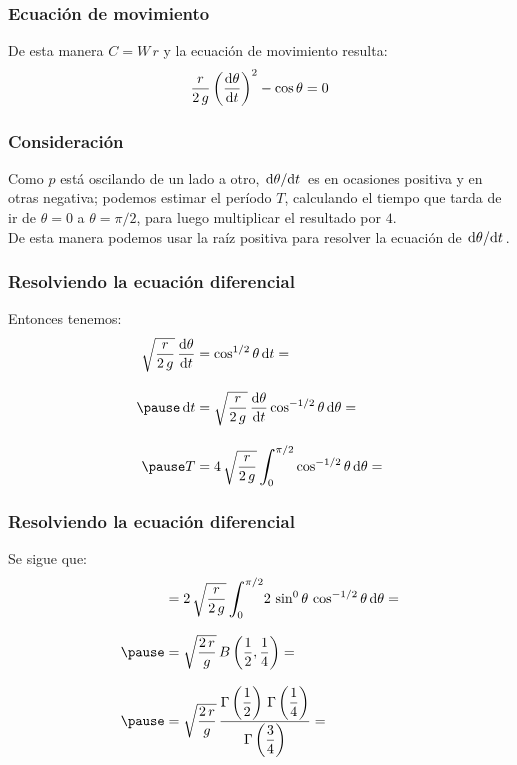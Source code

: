 \documentclass[12pt]{beamer}
\begin{document}
\begin{frame}
\frametitle{Ecuación de movimiento}
De esta manera $C = W \, r$ y la ecuación de movimiento resulta:
\pause
\begin{align*}
\dfrac{r}{2 \, g} \left( \dv{\theta}{t} \right)^{2} - \cos \theta = 0
\end{align*}
\end{frame}
\begin{frame}
\frametitle{Consideración}
Como $p$ está oscilando de un lado a otro, $\dv*{\theta}{t}$ es en ocasiones positiva y en otras negativa; podemos estimar el período $T$, calculando el tiempo que tarda de ir de $\theta = 0$ a $\theta = \pi/2$, para luego multiplicar el resultado por $4$.
\\
\bigskip
\pause
De esta manera podemos usar la raíz positiva para resolver la ecuación de $\dv*{\theta}{t}$.
\end{frame}
\begin{frame}
\frametitle{Resolviendo la ecuación diferencial}
Entonces tenemos:
\pause
\begin{eqnarray*}
\begin{aligned}
\sqrt{\dfrac{r}{2 \, g}} \, \dv{\theta}{t} &= \cos^{1/2} \theta \dd{t} = \\[1em] \pause
\dd{t} &= \sqrt{\dfrac{r}{2 \, g}} \, \dv{\theta}{t} \cos^{-1/2} \theta \dd{\theta} = \\[1em] \pause
T &= 4 \, \sqrt{\dfrac{r}{2 \, g}} \, \scaleint{6ex}_{\bs {0}}^{\pi/2} \cos^{-1/2} \theta \dd{\theta} =
\end{aligned}
\end{eqnarray*}
\end{frame}
\begin{frame}
\frametitle{Resolviendo la ecuación diferencial}
Se sigue que:
\begin{eqnarray*}
\begin{aligned}
&= 2 \, \sqrt{\dfrac{r}{2 \, g}} \, \scaleint{6ex}_{\bs {0}}^{\pi/2} 2 \, \sin^{0} \theta \, \cos^{-1/2} \theta \dd{\theta} = \\[0.8em] \pause
&= \sqrt{\dfrac{2 \, r}{g}} \, B \left( \dfrac{1}{2}, \dfrac{1}{4} \right) = \\[0.8em] \pause
&= \sqrt{\dfrac{2 \, r}{g}} \, \dfrac{\Gamma \left(\dfrac{1}{2} \right) \, \Gamma \left(\dfrac{1}{4} \right)}{\Gamma \left(\dfrac{3}{4} \right)} = 
\end{aligned}
\end{eqnarray*}
\end{frame}
\end{document}
